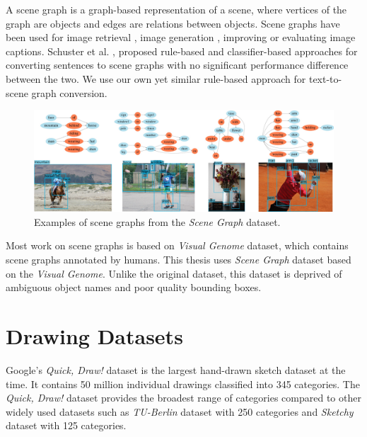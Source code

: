 A scene graph is a graph-based representation of a scene, where vertices of the graph are objects and edges are relations between objects. Scene graphs have been used for image retrieval \citep{schuster2015generating,johnson2015image}, image generation \citep{johnson2018image}, improving \citep{Liu_2017} or evaluating \citep{anderson2016spice} image captions. Schuster et al.  \citep{schuster2015generating}, proposed rule-based and \break classifier-based approaches for converting sentences to scene graphs with no significant performance difference between the two. We use our own yet similar rule-based approach for text-to-scene graph conversion.

\begin{figure}[ht]
    \centering
    \includegraphics[width=\textwidth]{figures/scene_graph.jpeg}
    \caption[Examples of scene graphs]{Examples of scene graphs from the \emph{Scene Graph} dataset. \citep{xu2017scenegraph}}
    \label{fig:scene_graph_example}
\end{figure}
\addtocounter{footnote}{1}

\medskip

Most work on scene graphs is based on \emph{Visual Genome}  \citep{krishnavisualgenome} dataset, which contains scene graphs annotated by humans. This thesis uses \emph{Scene Graph}  \citep{xu2017scenegraph} dataset based on the \emph{Visual Genome}. Unlike the original dataset, this dataset is deprived of ambiguous object names and poor quality bounding boxes.

\section{Drawing Datasets}

Google's \emph{Quick, Draw!} \citep{quickdraw} dataset is the largest hand-drawn sketch dataset at the time. It contains 50 million individual drawings classified into 345 categories. The \emph{Quick, Draw!} dataset provides the broadest range of categories compared to other widely used datasets such as \emph{TU-Berlin} \citep{eitz2012hdhso} dataset with 250 categories and \emph{Sketchy} \citep{sketchy2016} dataset with 125 categories.


